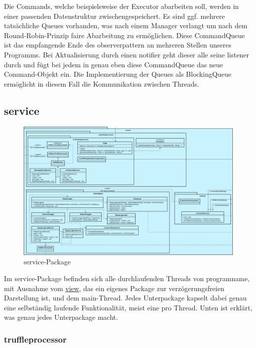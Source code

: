       \medskip
      Die Commands, welche beispielsweise der Executor abarbeiten soll, werden in
      einer passenden Datenstruktur zwischengespeichert. Es sind ggf. mehrere
      tatsächliche Queues vorhanden, was nach einem Manager verlangt um nach dem
      Round-Robin-Prinzip faire Abarbeitung zu ermöglichen. Diese CommandQueue
      ist das empfangende Ende des \gls{observerpattern} an mehreren Stellen unseres
      Programms. Bei Aktualisierung durch einen \gls{notifier} geht dieser alle
      seine \gls{listener} durch und fügt bei jedem in genau eben diese
      CommandQueue das neue Command-Objekt ein. Die Implementierung der Queues
      als BlockingQueue ermöglicht in diesem Fall die Kommunikation zwischen Threads.

\subsection{service}
\label{subsec:service}

\begin{figure}[H]
  \centering
  \includegraphics[width=\textwidth]{../diagramimages/service.png}
  \caption{service-Package}
\end{figure}

\medskip
Im service-Package befinden sich alle durchlaufenden Threads von \gls{programname},
mit Ausnahme vom \hyperref[subsec:view]{view}, das ein eigenes Package zur verzögerungsfreien Darstellung ist, und dem
main-Thread. Jedes Unterpackage kapselt dabei genau eine selbständig laufende Funktionalität, meist eine pro Thread. Unten ist erklärt, was genau jedes Unterpackage macht.

    \subsubsection{truffleprocessor}
    \label{subsubsec:truffleprocessor}

